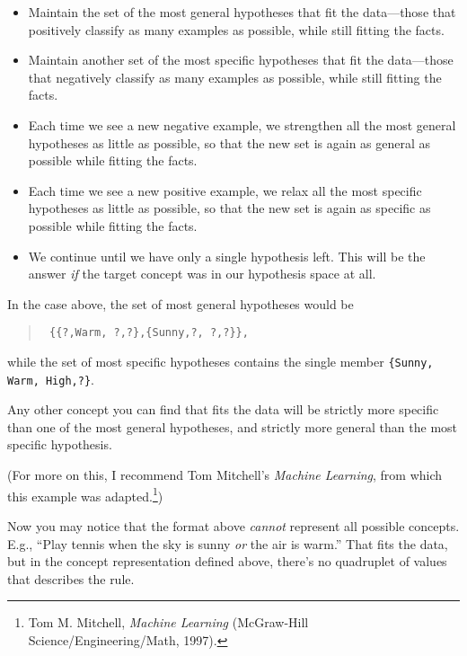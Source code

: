 \begin{itemize}
\item{
 Maintain the set of the most general hypotheses that fit the
data---those that positively classify as many examples as possible,
while still fitting the facts.}

\item{
 Maintain another set of the most specific hypotheses that fit the
data---those that negatively classify as many examples as possible,
while still fitting the facts.}

\item{
 Each time we see a new negative example, we strengthen all the
most general hypotheses as little as possible, so that the new set is
again as general as possible while fitting the facts.}

\item{
 Each time we see a new positive example, we relax all the most
specific hypotheses as little as possible, so that the new set is again
as specific as possible while fitting the facts.}

\item{
 We continue until we have only a single hypothesis left. This will
be the answer \textit{if} the target concept was in our hypothesis
space at all.}
\end{itemize}

{
 In the case above, the set of most general hypotheses would be}

\begin{verse}
\texttt{  \{\{?,Warm, ?,?\},\{Sunny,?, ?,?\}\},}\\
\end{verse}

{
 while the set of most specific hypotheses contains the single
member \texttt{\{Sunny, Warm, High,?\}}. }

{
 Any other concept you can find that fits the data will be strictly
more specific than one of the most general hypotheses, and strictly
more general than the most specific hypothesis.}

{
 (For more on this, I recommend Tom Mitchell's
\textit{Machine Learning}, from which this example was
adapted.\footnote{Tom M. Mitchell, \textit{Machine Learning} (McGraw-Hill
Science/Engineering/Math, 1997).})}

{
 Now you may notice that the format above \textit{cannot} represent
all possible concepts. E.g., ``Play tennis when the
sky is sunny \textit{or} the air is warm.'' That fits
the data, but in the concept representation defined above,
there's no quadruplet of values that describes the
rule.}

